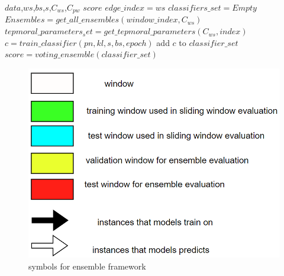 \documentclass{IEEEtran}
\begin{document}
\begin{algorithm*}
\begin{algorithmic}[1]
\REQUIRE  $data$,$ws$,$bs$,$s$,$C_{ws}$,$C_{pw}$
\ENSURE $score$
\STATE $edge\_index = ws$
\STATE $classifiers\_set = Empty$
    \STATE $Ensembles = get\_all\_ensembles(window\_index, C_{ws})$
        \STATE $tepmoral\_parameters_set = get\_tepmoral\_parameters(C_{ws}, index)$
            \STATE $c = train\_classifier(pn, kl, s, bs, epoch)$
            \STATE add $c$ to $classifier\_set$
        \ENDFOR
    \ENDFOR
    \STATE $score = voting\_ensemble(classifier\_set)$
\ENDWHILE
\end{algorithmic}
\end{algorithm*}


\begin{figure}[htbp]
\centering
\includegraphics[width=.9\linewidth]{images/screenshot_20220321_130824.png}
\caption{\label{symbols for ensemble framework}symbols for ensemble framework}
\end{figure}
\end{document}
